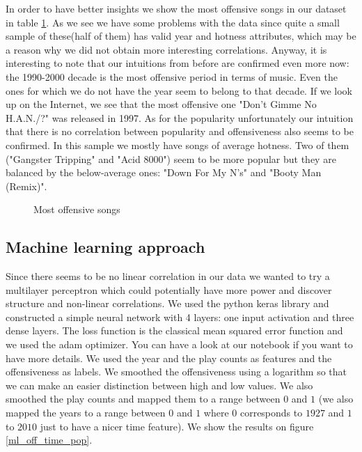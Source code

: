 \documentclass[11pt]{article}
\begin{document}
In order to have better insights we show the most offensive songs in our dataset in table \ref{most_offensive_songs}. As we see we have some problems with the data since quite a small sample of these(half of them) has valid year and hotness attributes, which may be a reason why we did not obtain more interesting correlations. Anyway, it is interesting to note that our intuitions from before are confirmed even more now: the 1990-2000 decade is the most offensive period in terms of music. Even the ones for which we do not have the year seem to belong to that decade. If we look up on the Internet, we see that the most offensive one "Don't Gimme No H.A.N./?" was released in 1997. As for the popularity unfortunately our intuition that there is no correlation between popularity and offensiveness also seems to be confirmed. In this sample we mostly have songs of average hotness. Two of them ("Gangster Tripping" and "Acid 8000") seem to be more popular but they are balanced by the below-average ones: "Down For My N's" and "Booty Man (Remix)".

\begin{figure}
\centering

\caption{Most offensive songs}
\label{most_offensive_songs}
\end{figure}

\subsection{Machine learning approach}

Since there seems to be no linear correlation in our data we wanted to try a multilayer perceptron which could potentially have more power and discover structure and non-linear correlations. We used the python keras library and constructed a simple neural network with 4 layers: one input activation and three dense layers. The loss function is the classical mean squared error function and we used the adam optimizer. You can have a look at our notebook if you want to have more details. We used the year and the play counts as features and the offensiveness as labels. We smoothed the offensiveness using a logarithm so that we can make an easier distinction between high and low values. We also smoothed the play counts and mapped them to a range between $0$ and $1$ (we also mapped the years to a range between $0$ and $1$ where $0$ corresponds to $1927$ and $1$ to $2010$ just to have a nicer time feature). We show the results on figure \ref{ml_off_time_pop}.
\end{document}
